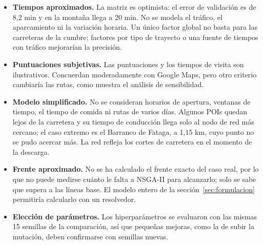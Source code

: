 \begin{itemize}
  \item \textbf{Tiempos aproximados.} La matriz es optimista: el error de validación es de 8,2 min y en la montaña llega a 20 min. No se modela el tráfico, el aparcamiento ni la variación horaria. Un único factor global no basta para las carreteras de la cumbre; factores por tipo de trayecto o una fuente de tiempos con tráfico mejorarían la precisión.
  \item \textbf{Puntuaciones subjetivas.} Las puntuaciones y los tiempos de visita son ilustrativos. Concuerdan moderadamente con Google Maps, pero otro criterio cambiaría las rutas, como muestra el análisis de sensibilidad.
  \item \textbf{Modelo simplificado.} No se consideran horarios de apertura, ventanas de tiempo, el tiempo de comida ni rutas de varios días. Algunos POIs quedan lejos de la carretera y su tiempo de conducción llega solo al nodo de red más cercano; el caso extremo es el Barranco de Fataga, a 1,15 km, cuyo punto no se pudo acercar más. La red refleja los cortes de carretera en el momento de la descarga.
  \item \textbf{Frente aproximado.} No se ha calculado el frente exacto del caso real, por lo que no puede medirse cuánto le falta a NSGA-II para alcanzarlo; solo se sabe que supera a las líneas base. El modelo entero de la sección~\ref{sec:formulacion} permitiría calcularlo con un resolvedor.
  \item \textbf{Elección de parámetros.} Los hiperparámetros se evaluaron con las mismas 15 semillas de la comparación, así que pequeñas mejoras, como la de subir la mutación, deben confirmarse con semillas nuevas.
\end{itemize}
